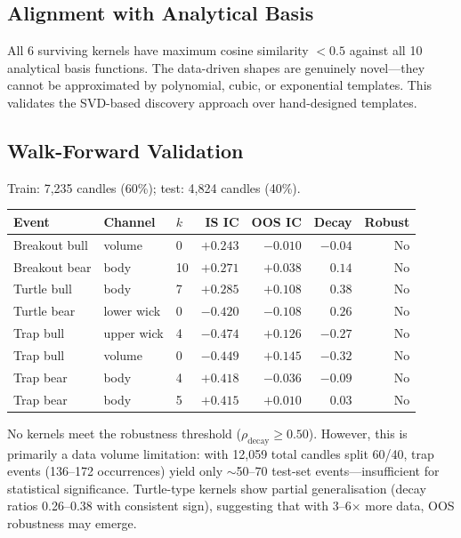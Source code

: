 \documentclass[11pt,a4paper]{article}
\theoremstyle{definition}
\theoremstyle{plain}
\begin{document}
\subsection{Alignment with Analytical Basis}

All 6 surviving kernels have maximum cosine similarity $< 0.5$ against all
10 analytical basis functions. The data-driven shapes are genuinely
novel---they cannot be approximated by polynomial, cubic, or exponential
templates. This validates the SVD-based discovery approach over hand-designed
templates.

\subsection{Walk-Forward Validation}

Train: 7,235 candles (60\%); test: 4,824 candles (40\%).

\begin{center}
\small
\begin{tabular}{lllrrrr}
\hline
\textbf{Event} & \textbf{Channel} & $k$ & \textbf{IS IC} & \textbf{OOS IC} & \textbf{Decay} & \textbf{Robust} \\
\hline
Breakout bull & volume      & 0  & $+0.243$ & $-0.010$ & $-0.04$ & No \\
Breakout bear & body        & 10 & $+0.271$ & $+0.038$ & $0.14$  & No \\
Turtle bull   & body        & 7  & $+0.285$ & $+0.108$ & $0.38$  & No \\
Turtle bear   & lower wick  & 0  & $-0.420$ & $-0.108$ & $0.26$  & No \\
Trap bull     & upper wick  & 4  & $-0.474$ & $+0.126$ & $-0.27$ & No \\
Trap bull     & volume      & 0  & $-0.449$ & $+0.145$ & $-0.32$ & No \\
Trap bear     & body        & 4  & $+0.418$ & $-0.036$ & $-0.09$ & No \\
Trap bear     & body        & 5  & $+0.415$ & $+0.010$ & $0.03$  & No \\
\hline
\end{tabular}
\end{center}

No kernels meet the robustness threshold ($\rho_{\mathrm{decay}} \geq
0.50$). However, this is primarily a data volume limitation: with 12{,}059
total candles split 60/40, trap events (136--172 occurrences) yield only
$\sim$50--70 test-set events---insufficient for statistical significance.
Turtle-type kernels show partial generalisation (decay ratios 0.26--0.38
with consistent sign), suggesting that with 3--6$\times$ more data, OOS
robustness may emerge.
\end{document}
